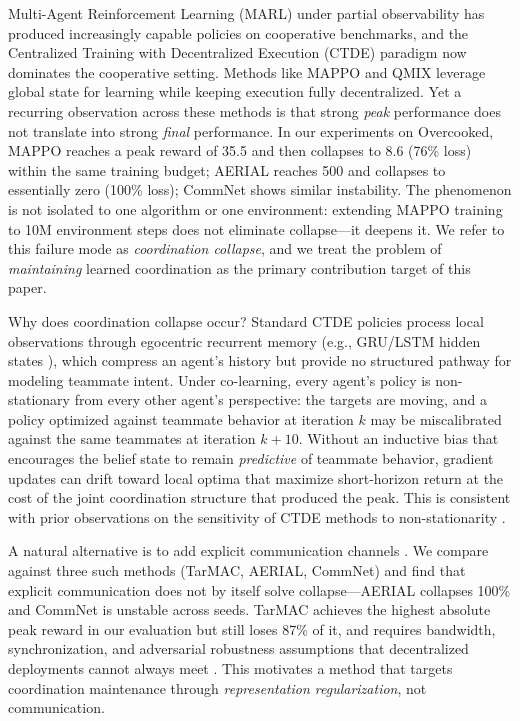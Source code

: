 \documentclass{article}
\theoremstyle{plain}
\theoremstyle{definition}
\theoremstyle{remark}
\begin{document}
Multi-Agent Reinforcement Learning (MARL) under partial observability has produced increasingly capable policies on cooperative benchmarks, and the Centralized Training with Decentralized Execution (CTDE) paradigm \cite{lowe2017multi} now dominates the cooperative setting. Methods like MAPPO \cite{yu2022surprising} and QMIX \cite{rashid2020monotonic} leverage global state for learning while keeping execution fully decentralized. Yet a recurring observation across these methods is that strong \emph{peak} performance does not translate into strong \emph{final} performance. In our experiments on Overcooked, MAPPO reaches a peak reward of 35.5 and then collapses to 8.6 (76\% loss) within the same training budget; AERIAL \cite{phan2023attention} reaches 500 and collapses to essentially zero (100\% loss); CommNet shows similar instability. The phenomenon is not isolated to one algorithm or one environment: extending MAPPO training to 10M environment steps does not eliminate collapse---it deepens it. We refer to this failure mode as \emph{coordination collapse}, and we treat the problem of \emph{maintaining} learned coordination as the primary contribution target of this paper.

Why does coordination collapse occur? Standard CTDE policies process local observations through egocentric recurrent memory (e.g., GRU/LSTM hidden states \cite{hausknecht2015deep}), which compress an agent's history but provide no structured pathway for modeling teammate intent. Under co-learning, every agent's policy is non-stationary from every other agent's perspective: the targets are moving, and a policy optimized against teammate behavior at iteration $k$ may be miscalibrated against the same teammates at iteration $k{+}10$. Without an inductive bias that encourages the belief state to remain \emph{predictive} of teammate behavior, gradient updates can drift toward local optima that maximize short-horizon return at the cost of the joint coordination structure that produced the peak. This is consistent with prior observations on the sensitivity of CTDE methods to non-stationarity \cite{hu2025adaptability, amato2024introduction}.

A natural alternative is to add explicit communication channels \cite{foerster2016learning, wang2020learning, sukhbaatar2016commnet, das2019tarmac}. We compare against three such methods (TarMAC, AERIAL, CommNet) and find that explicit communication does not by itself solve collapse---AERIAL collapses 100\% and CommNet is unstable across seeds. TarMAC achieves the highest absolute peak reward in our evaluation but still loses 87\% of it, and requires bandwidth, synchronization, and adversarial robustness assumptions that decentralized deployments cannot always meet \cite{liu2025robust}. This motivates a method that targets coordination maintenance through \emph{representation regularization}, not communication.
\end{document}
